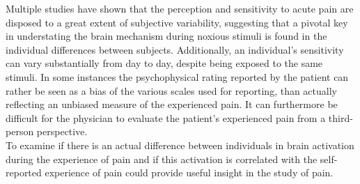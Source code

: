 Multiple studies \cite{Davis2017,Coghill2003,Kim2004,Emerson2014} have shown that the perception and sensitivity to acute pain are disposed to a great extent of subjective variability, suggesting that a pivotal key in understating the brain mechanism during noxious stimuli is found in the individual differences between subjects. Additionally, an individual's sensitivity can vary substantially from day to day, despite being exposed to the same stimuli. In some instances the psychophysical rating reported by the patient can rather be seen as a bias of the various scales used for reporting, than actually reflecting an unbiased measure of the experienced pain. It can furthermore be difficult for the physician to evaluate the patient's experienced pain from a third-person perspective. \cite{Coghill2003} \\
To examine if there is an actual difference between individuals in brain activation during the experience of pain and if this activation is correlated with the self-reported experience of pain could provide useful insight in the study of pain. 